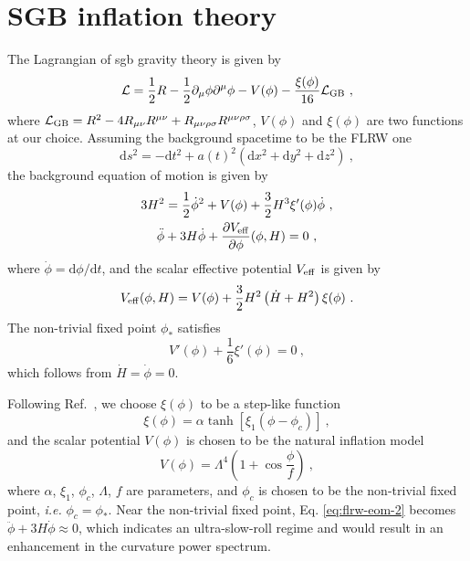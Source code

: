 \documentclass[reprint, 10pt, amsmath, amssymb, floatfix, aps, prd, superscriptaddress, nofootinbib, nobibnotes,twocolumn]{revtex4-1}
\def\dd{{\mathrm{d}}}
\begin{document}
\section{SGB inflation theory}
\label{sec:gb-gravity}
The Lagrangian of \ac{sgb} gravity theory is given by
\begin{equation}
    \mathcal L = \frac{1}{2}R - \frac12\partial_\mu\phi\partial^\mu\phi - V(\phi) - \frac{\xi(\phi)}{16}\mathcal{L}_{\rm GB} \ ,
\end{equation}
where $\mathcal{L}_{\rm GB} = R^2 - 4R_{\mu\nu}R^{\mu\nu} + R_{\mu\nu\rho\sigma}R^{\mu\nu\rho\sigma}$, $V(\phi)$ and $\xi(\phi)$ are two functions at our choice. Assuming the background spacetime to be the FLRW one
\begin{equation}
    \dd s^2 = -\dd t^2 + a(t)^2(\dd x^2 + \dd y^2 + \dd z^2) \ ,
\end{equation}
the background equation of motion is given by
\begin{gather}
    3H^2 = \frac12 \dot\phi^2 + V(\phi) + \frac32 H^3\xi'(\phi)\dot\phi \ ,\nonumber\\
    \ddot\phi + 3H\dot\phi + \frac{\partial V_{\rm eff}}{\partial\phi}(\phi, H) = 0 \ ,\label{eq:flrw-eom-2}
\end{gather}
where $\dot{\phi} = \dd\phi/\dd t$, and the scalar effective potential $V_{\rm eff}$ is given by
\begin{equation}
	V_{\rm eff}(\phi, H) = V(\phi) + \frac32 H^2\left(\dot H + H^2\right)\xi(\phi) \ .
\end{equation}
The non-trivial fixed point $\phi_\ast$ satisfies
\begin{equation}
    V'(\phi) + \frac{1}{6}\xi'(\phi) = 0 \ ,
\end{equation}
which follows from $\dot H = \dot\phi = 0$.

Following Ref.~\cite{Kawai:2021edk}, we choose $\xi(\phi)$ to be a step-like function
\begin{equation}
    \xi(\phi) = \alpha\tanh[\xi_1(\phi - \phi_c)] \ ,
\end{equation}
and the scalar potential $V(\phi)$ is chosen to be the natural inflation model
\begin{equation}
    V(\phi) = \Lambda^4\left(1 + \cos\frac{\phi}{f}\right) \ ,
\end{equation}
where $\alpha$, $\xi_1$, $\phi_c$, $\Lambda$, $f$ are parameters, and $\phi_c$ is chosen to be the non-trivial fixed point, \textit{i.e.} $\phi_c = \phi_\ast$. Near the non-trivial fixed point, Eq. \eqref{eq:flrw-eom-2} becomes $\ddot\phi + 3H\dot\phi \approx 0$, which indicates an ultra-slow-roll regime and would result in an enhancement in the curvature power spectrum.
\end{document}
